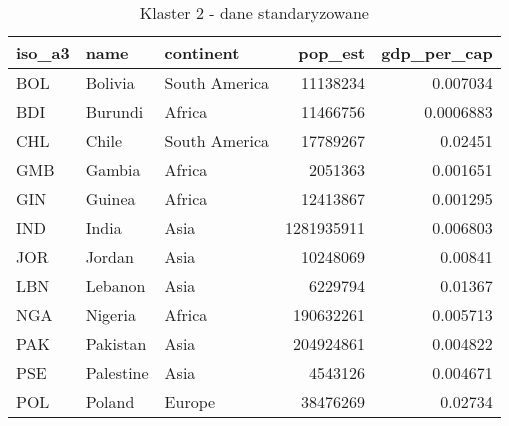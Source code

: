 \begin{table}[h!]
    \centering
    \caption{Klaster 2 - dane standaryzowane}
    \label{tab:cl2std}
    \begin{tabular}{lllrr}
        \toprule
        iso\_a3 & name      & continent     & pop\_est   & gdp\_per\_cap \\
        \midrule
        BOL     & Bolivia   & South America & 11138234   & 0.007034      \\
        BDI     & Burundi   & Africa        & 11466756   & 0.0006883     \\
        CHL     & Chile     & South America & 17789267   & 0.02451       \\
        GMB     & Gambia    & Africa        & 2051363    & 0.001651      \\
        GIN     & Guinea    & Africa        & 12413867   & 0.001295      \\
        IND     & India     & Asia          & 1281935911 & 0.006803      \\
        JOR     & Jordan    & Asia          & 10248069   & 0.00841       \\
        LBN     & Lebanon   & Asia          & 6229794    & 0.01367       \\
        NGA     & Nigeria   & Africa        & 190632261  & 0.005713      \\
        PAK     & Pakistan  & Asia          & 204924861  & 0.004822      \\
        PSE     & Palestine & Asia          & 4543126    & 0.004671      \\
        POL     & Poland    & Europe        & 38476269   & 0.02734       \\
        \bottomrule
    \end{tabular}
\end{table}
